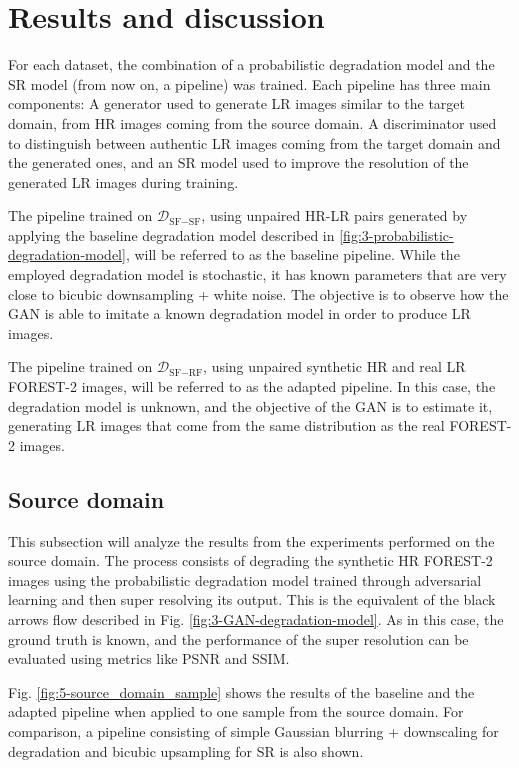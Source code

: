 
\section{Results and discussion}
\label{sec:results}


For each dataset, the combination of a probabilistic degradation model and the SR model (from now on, a pipeline) was trained. 
Each pipeline has three main components: A generator used to generate LR images similar to the target domain, from HR images coming from the source domain. A discriminator used to distinguish between authentic LR images coming from the target domain and the generated ones, and an SR model used to improve the resolution of the generated LR images during training.


The pipeline trained on $\mathcal{D}_{\text{SF}-\text{SF}}$, using unpaired HR-LR pairs generated by applying the baseline degradation model described in \ref{fig:3-probabilistic-degradation-model}, will be referred to as the baseline pipeline.
While the employed degradation model is stochastic, it has known parameters that are very close to bicubic downsampling + white noise. The objective is to observe how the GAN is able to imitate a known degradation model in order to produce LR images.

The pipeline trained on $\mathcal{D}_{\text{SF}-\text{RF}}$, using unpaired synthetic HR and real LR FOREST-2 images, will be referred to as the adapted pipeline.
In this case, the degradation model is unknown, and the objective of the GAN is to estimate it, generating LR images that come from the same distribution as the real FOREST-2 images.

    \subsection{Source domain}

        This subsection will analyze the results from the experiments performed on the source domain.
        The process consists of degrading the synthetic HR FOREST-2 images using the probabilistic degradation model trained through adversarial learning and then super resolving its output.
        This is the equivalent of the black arrows flow described in Fig. \ref{fig:3-GAN-degradation-model}. 
        As in this case, the ground truth is known, and the performance of the super resolution can be evaluated using metrics like PSNR and SSIM. 

        Fig. \ref{fig:5-source_domain_sample} shows the results of the baseline and the adapted pipeline when applied to one sample from the source domain. For comparison, a pipeline consisting of simple Gaussian blurring + downscaling for degradation and bicubic upsampling for SR is also shown. 

